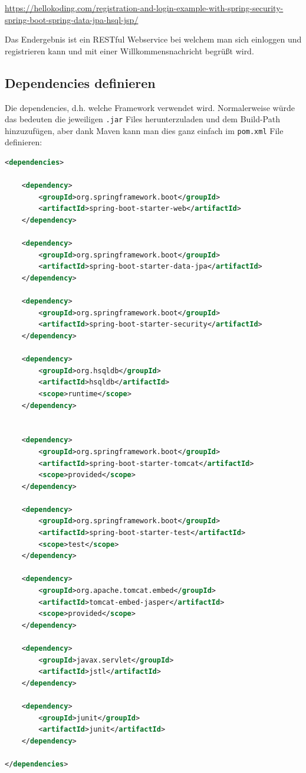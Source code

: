 \href{https://hellokoding.com/registration-and-login-example-with-spring-security-spring-boot-spring-data-jpa-hsql-jsp/}{https://hellokoding.com/registration-and-login-example-with-spring-security-spring-boot-spring-data-jpa-hsql-jsp/}
 
Das Endergebnis ist ein RESTful Webservice bei welchem man sich einloggen und registrieren kann und mit einer Willkommensnachricht begrüßt wird. 

\subsection{Dependencies definieren}
Die dependencies, d.h. welche Framework verwendet wird. Normalerweise würde das bedeuten die jeweiligen \verb|.jar| Files herunterzuladen und dem Build-Path hinzuzufügen, aber dank Maven kann man dies ganz einfach im \verb|pom.xml| File definieren:

\begin{lstlisting}[language=xml]
<dependencies>

	<dependency>
		<groupId>org.springframework.boot</groupId>
		<artifactId>spring-boot-starter-web</artifactId>
	</dependency>
  
	<dependency>
		<groupId>org.springframework.boot</groupId>
		<artifactId>spring-boot-starter-data-jpa</artifactId>
	</dependency>
  
	<dependency>
		<groupId>org.springframework.boot</groupId>
		<artifactId>spring-boot-starter-security</artifactId>
	</dependency>
  
	<dependency>
		<groupId>org.hsqldb</groupId>
		<artifactId>hsqldb</artifactId>
		<scope>runtime</scope>
	</dependency>
  
  
	<dependency>
		<groupId>org.springframework.boot</groupId>
		<artifactId>spring-boot-starter-tomcat</artifactId>
		<scope>provided</scope>
	</dependency>
  
	<dependency>
		<groupId>org.springframework.boot</groupId>
		<artifactId>spring-boot-starter-test</artifactId>
		<scope>test</scope>
	</dependency>
  
	<dependency>
		<groupId>org.apache.tomcat.embed</groupId>
		<artifactId>tomcat-embed-jasper</artifactId>
		<scope>provided</scope>
	</dependency>
  
	<dependency>
		<groupId>javax.servlet</groupId>
		<artifactId>jstl</artifactId>
	</dependency>
  
	<dependency>
		<groupId>junit</groupId>
		<artifactId>junit</artifactId>
	</dependency>
  
</dependencies>
\end{lstlisting}

